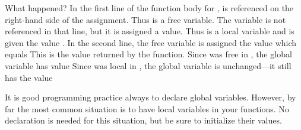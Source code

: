 What happened?
In the first line of the function body for ,  is
referenced on the right-hand side of the assignment.
Thus  is a free variable.
The variable  is not referenced in that line, but it is
assigned a value.
Thus  is a local variable and is given the value
.
In the second line, the free variable  is assigned the value
 which equals 
This is the value returned by the function.
Since  was free in , the global variable 
has value 
Since  was local in , the global variable 
is unchanged---it still has the value 

It is good programming practice always to declare global variables.
However, by far the most common situation is to have local variables in
your functions.
No declaration is needed for this situation, but be sure to
initialize their values.

